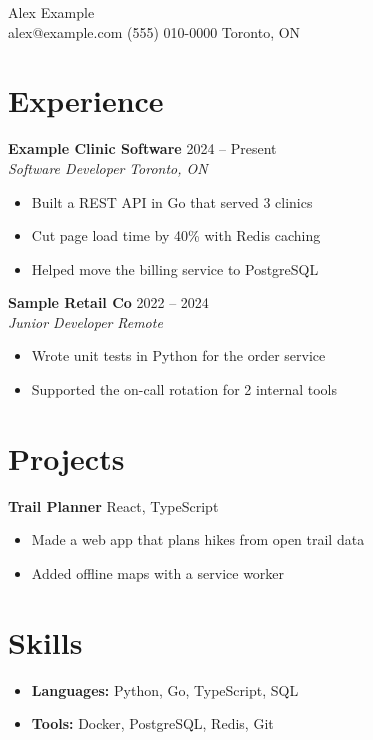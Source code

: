 \documentclass[letterpaper,11pt]{article}
\newcommand{\resumeItem}[1]{\item #1}
\newcommand{\entry}[4]{\textbf{#1} \hfill #2 \\ \textit{#3} \hfill \textit{#4}}
\begin{document}
\begin{center}
  {\LARGE Alex Example} \\
  alex@example.com \quad (555) 010-0000 \quad Toronto, ON
\end{center}

\section*{Experience}
\entry{Example Clinic Software}{2024 -- Present}{Software Developer}{Toronto, ON}
\begin{itemize}
  \resumeItem{Built a REST API in Go that served 3 clinics} %
  \resumeItem{Cut page load time by 40\% with Redis caching} %
  \resumeItem{Helped move the billing service to PostgreSQL} %
\end{itemize}

\entry{Sample Retail Co}{2022 -- 2024}{Junior Developer}{Remote}
\begin{itemize}
  \resumeItem{Wrote unit tests in Python for the order service} %
  \resumeItem{Supported the on-call rotation for 2 internal tools} %
\end{itemize}

\section*{Projects}
\textbf{Trail Planner} \hfill React, TypeScript
\begin{itemize}
  \resumeItem{Made a web app that plans hikes from open trail data} %
  \resumeItem{Added offline maps with a service worker} %
\end{itemize}

\section*{Skills}
\begin{itemize}
  \item \textbf{Languages:} Python, Go, TypeScript, SQL %
  \item \textbf{Tools:} Docker, PostgreSQL, Redis, Git %
\end{itemize}
\end{document}
